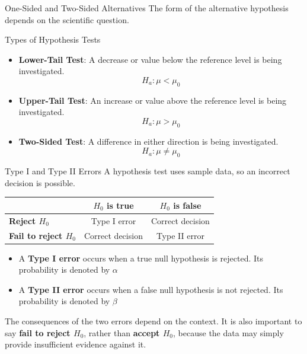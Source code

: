 \documentclass[aspectratio=169]{beamer}
\begin{document}
\begin{frame}{One-Sided and Two-Sided Alternatives}
The form of the alternative hypothesis depends on the scientific question.
\begin{block}{Types of Hypothesis Tests}
\begin{itemize}
	\item \textbf{Lower-Tail Test}: A decrease or value below the reference level is being investigated.
	$$H_a:\mu<\mu_0$$
	\item \textbf{Upper-Tail Test}: An increase or value above the reference level is being investigated.
$$H_a:\mu>\mu_0$$
	\item \textbf{Two-Sided Test}: A difference in either direction is being investigated.
$$H_a:\mu\ne\mu_0$$
\end{itemize}
\end{block}
\end{frame}

\begin{frame}{Type I and Type II Errors}
A hypothesis test uses sample data, so an incorrect decision is possible.
\begin{center}
\begin{tabular}{lcc}
\toprule
 & \textbf{$H_0$ is true} & \textbf{$H_0$ is false} \\
\midrule
\textbf{Reject $H_0$}
& Type I error
& Correct decision \\[1mm]

\textbf{Fail to reject $H_0$}
& Correct decision
& Type II error \\
\bottomrule
\end{tabular}
\end{center}

\begin{itemize}
	\item A \textbf{Type I error} occurs when a true null hypothesis is rejected. Its probability is denoted by $\alpha$
	\item A \textbf{Type II error} occurs when a false null hypothesis is not rejected. Its probability is denoted by $\beta$
\end{itemize}

\vspace{0.15cm}
The consequences of the two errors depend on the context. It is also important to say \textbf{fail to reject $H_0$}, rather than \textbf{accept $H_0$}, because the data may simply provide insufficient evidence against it.
\end{frame}
\end{document}
